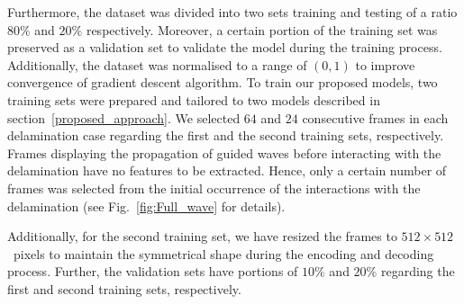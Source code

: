 Furthermore, the dataset was divided into two sets training and testing of a ratio \(80\%\) and \(20\% \) respectively.
Moreover, a certain portion of the training set was preserved as a validation set to validate the model during the training process.
Additionally, the dataset was normalised to a range of \((0, 1)\) to improve convergence of gradient descent algorithm.
To train our proposed models, two training sets were prepared and tailored to two models described in section~\ref{proposed_approach}.
We selected \(64\) and \(24\) consecutive frames in each delamination case regarding the first and the second training sets, respectively.
Frames displaying the propagation of guided waves before interacting with the delamination have no features to be extracted.  
Hence, only a certain number of frames was selected from the initial occurrence of the interactions with the delamination (see Fig.~\ref{fig:Full_wave} for details).

Additionally, for the second training set, we have resized the frames to \(512\times512\)~pixels to maintain the symmetrical shape during the encoding and decoding process.
Further, the validation sets have portions of \(10\%\) and \(20\%\) regarding the first and second training sets, respectively.